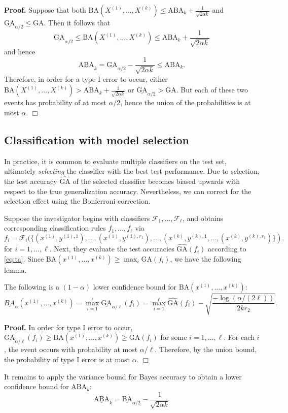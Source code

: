 \textbf{Proof.}
Suppose that both $\text{BA}(X^{(1)},\hdots,
X^{(k)}) \leq \text{ABA}_k + \frac{1}{\sqrt{2\alpha k}}$ and
$\underline{\text{GA}}_{\alpha/2} \leq \text{GA}.$
Then it follows that
\[
\underline{\text{GA}}_{\alpha/2} \leq \text{BA}(X^{(1)},\hdots,
X^{(k)}) \leq \text{ABA}_k + \frac{1}{\sqrt{2\alpha k}}
\]
and hence
\[
\underline{\text{ABA}}_k = \underline{\text{GA}}_{\alpha/2} -  \frac{1}{\sqrt{2\alpha k}} \leq \text{ABA}_k.
\]
Therefore, in order for a type I error to occur, either
$\text{BA}(X^{(1)},\hdots, X^{(k)}) > \text{ABA}_k
+ \frac{1}{\sqrt{2\alpha k}}$ or $\underline{\text{GA}}_{\alpha/2}
> \text{GA}.$ But each of these two events has probability of at most
$\alpha/2$, hence the union of the probabilities is at most
$\alpha$. $\Box$

\subsection{Classification with model selection}

In practice, it is common to evaluate multiple classifiers on the test
set, ultimately \emph{selecting} the classifier with the best test
performance.  Due to selection, the test accuracy
$\widehat{\text{GA}}$ of the selected classifier becomes biased
upwards with respect to the true generalization
accuracy. Nevertheless, we can correct for the selection effect using
the Bonferroni correction.

Suppose the investigator begins with classifiers
$\mathcal{F}_1,\hdots, \mathcal{F}_\ell$, and obtains corresponding
classification rules $f_1,\hdots, f_\ell$ via
\[
f_i = \mathcal{F}_i(\{(x^{(1)}, y^{(1),1}),\hdots, (x^{(1)},y^{(1),r_1}), \hdots, (x^{(k)}, y^{(k),1},\hdots, (x^{(k)},y^{(k), r_1})\}).
\]
for $i = 1,\hdots, \ell$.  Next, they evaluate the test accuracies
$\widehat{\text{GA}}(f_i)$ according to \eqref{eq:ta}.
Since $\text{BA}(x^{(1)},\hdots, x^{(k)}) \geq \max_i \text{GA}(f_i)$, we have the following lemma.

\begin{lemma}
The following is a $(1-\alpha)$ lower confidence bound for $\text{BA}(x^{(1)},\hdots, x^{(k)})$:
\[
\underline{BA}_\alpha(x^{(1)},\hdots, x^{(k)}) = \max_{i=1}^\ell \underline{\text{GA}}_{\alpha/\ell}(f_i) = \max_{i=1}^\ell \widehat{\text{GA}}(f_i) - \sqrt{\frac{-\log(\alpha/(2\ell))}{2kr_2}}.
\]
\end{lemma}

\textbf{Proof.}
In order for type I error to occur,
$\underline{\text{GA}}_{\alpha/\ell}(f_i) \geq \text{BA}(x^{(1)},\hdots,
x^{(k)}) \geq \text{GA}(f_i)$ for some $i = 1,\hdots, \ell$.  For each
$i$, the event occurs with probability at most $\alpha/\ell$.
Therefore, by the union bound, the probability of type I error is at
most $\alpha$.  $\Box$

It remains to apply the variance bound for Bayes accuracy to obtain a lower confidence bound for $\text{ABA}_k$:
\[
\underline{\text{ABA}}_k = \underline{\text{BA}}_{\alpha/2} -  \frac{1}{\sqrt{2\alpha k}}
\]

